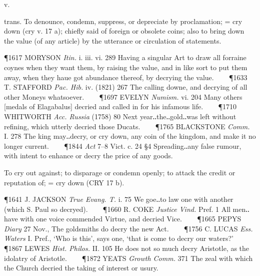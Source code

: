\begin{description}[wide, labelwidth=!, labelindent=0pt]
 v.

\noindent {}

\vspace{-0.3cm}

\begin{myenumerate}

 trans. To denounce, condemn, suppress, or depreciate by proclamation; = cry down (cry v. 17 a); chiefly said of foreign or obsolete coins; also to bring down the value (of any article) by the utterance or circulation of statements.

\P 1617 MORYSON  \textit{Itin.} i. iii. vi. 289 Having a singular Art to draw all forraine coynes when they want them, by raising the value, and in like sort to put them away, when they haue got abundance thereof, by decrying the value.    
\P 1633 T. STAFFORD  \textit{Pac. Hib.} iv. (1821) 267 The calling downe, and decrying of all other Moneys whatsoever.    
\P 1697 EVELYN  \textit{Numism.} vi. 204 Many others [medals of Elagabalus] decried and called in for his infamous life.    
\P 1710 WHITWORTH  \textit{Acc. Russia} (1758) 80 Next year‥the‥gold‥was left without refining, which utterly decried those Ducats.    
\P 1765 BLACKSTONE  \textit{Comm.} I. 278 The king may‥decry, or cry down, any coin of the kingdom, and make it no longer current.    
\P 1844  \textit{Act} 7–8 Vict. c. 24 §4 Spreading‥any false rumour, with intent to enhance or decry the price of any goods.

 To cry out against; to disparage or condemn openly; to attack the credit or reputation of; = cry down (CRY 17 b).

\P 1641 J. JACKSON  \textit{True Evang. T.} i. 75 We goe‥to law one with another (which S. Paul so decryed).    
\P 1660 R. COKE  \textit{Justice Vind.} Pref. 1 All men‥have with one voice commended Virtue, and decried Vice.    
\P 1665 PEPYS  \textit{Diary} 27 Nov., The goldsmiths do decry the new Act.    
\P 1756 C. LUCAS  \textit{Ess. Waters} I. Pref., ‘Who is this’, says one, ‘that is come to decry our waters?’    
\P 1867 LEWES  \textit{Hist. Philos.} II. 105 He does not so much decry Aristotle, as the idolatry of Aristotle.    
\P 1872 YEATS  \textit{Growth Comm.} 371 The zeal with which the Church decried the taking of interest or usury.


\end{myenumerate}
\end{description}
